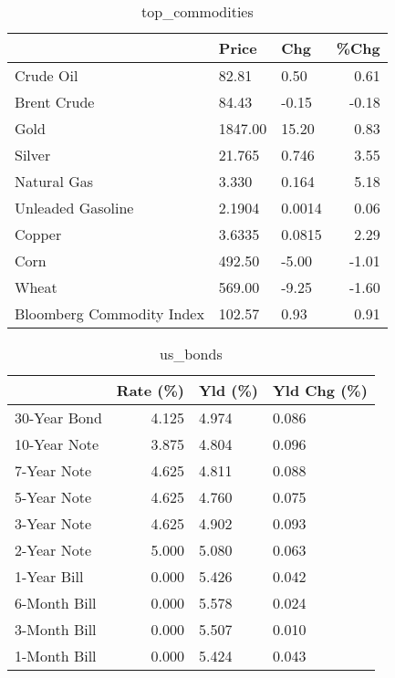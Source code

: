 \documentclass{article}%
\begin{document}
\begin{table}[htbp]%
\caption{top\_commodities}%
\centering%
\begin{adjustbox}{width=1\textwidth}%
\begin{tabular}{lllr}
\toprule
                          &   Price &    Chg &  \%Chg \\
\midrule
               Crude Oil  &   82.81 &   0.50 &  0.61 \\
             Brent Crude  &   84.43 &  -0.15 & -0.18 \\
                    Gold  & 1847.00 &  15.20 &  0.83 \\
                  Silver  &  21.765 &  0.746 &  3.55 \\
             Natural Gas  &   3.330 &  0.164 &  5.18 \\
       Unleaded Gasoline  &  2.1904 & 0.0014 &  0.06 \\
                  Copper  &  3.6335 & 0.0815 &  2.29 \\
                    Corn  &  492.50 &  -5.00 & -1.01 \\
                   Wheat  &  569.00 &  -9.25 & -1.60 \\
Bloomberg Commodity Index &  102.57 &   0.93 &  0.91 \\
\bottomrule
\end{tabular}
%
\end{adjustbox}%
\end{table}

%


\begin{table}[htbp]%
\caption{us\_bonds}%
\centering%
\begin{adjustbox}{width=1\textwidth}%
\begin{tabular}{lrll}
\toprule
             &  Rate (\%) & Yld (\%) & Yld Chg (\%) \\
\midrule
30-Year Bond &     4.125 &   4.974 &       0.086 \\
10-Year Note &     3.875 &   4.804 &       0.096 \\
 7-Year Note &     4.625 &   4.811 &       0.088 \\
 5-Year Note &     4.625 &   4.760 &       0.075 \\
 3-Year Note &     4.625 &   4.902 &       0.093 \\
 2-Year Note &     5.000 &   5.080 &       0.063 \\
 1-Year Bill &     0.000 &   5.426 &       0.042 \\
6-Month Bill &     0.000 &   5.578 &       0.024 \\
3-Month Bill &     0.000 &   5.507 &       0.010 \\
1-Month Bill &     0.000 &   5.424 &       0.043 \\
\bottomrule
\end{tabular}
%
\end{adjustbox}%
\end{table}
\end{document}

